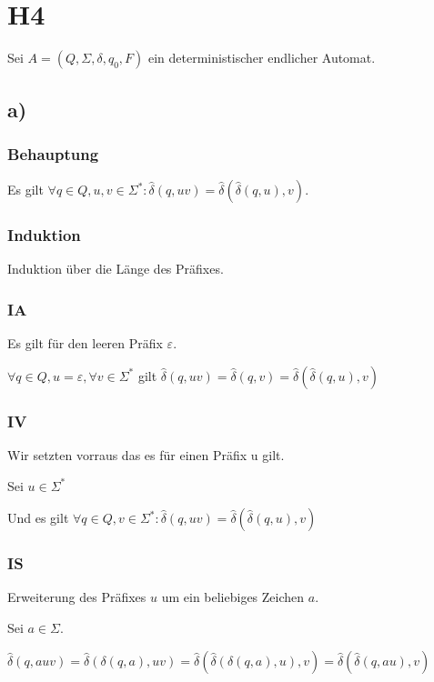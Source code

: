 \section*{H4}

Sei $A=(Q,\Sigma,\delta,q_0,F)$ ein deterministischer endlicher Automat.

\subsection*{a)}

	\subsubsection*{Behauptung}
	
	Es gilt $\forall q \in Q, u, v \in \Sigma^*: \hat{\delta}(q,uv) = \hat{\delta}(\hat{\delta}(q,u),v)$.

	\subsubsection*{Induktion}
	Induktion über die Länge des Präfixes.

	\subsubsection*{IA}
		Es gilt für den leeren Präfix $\varepsilon$.
		
		$\forall q \in Q, u = \varepsilon, \forall v \in \Sigma^*$ gilt $\hat{\delta}(q,uv) =  \hat{\delta}(q,v) = \hat{\delta}(\hat{\delta}(q,u),v)$ 

	\subsubsection*{IV}
	Wir setzten vorraus das es für einen Präfix u gilt.
	
	Sei $u \in \Sigma^*$
	
	Und es gilt 	
	$\forall q \in Q, v \in \Sigma^*:\hat{\delta}(q,uv) =  \hat{\delta}(\hat{\delta}(q,u),v)$ 
	
	\subsubsection*{IS}
	Erweiterung des Präfixes $u$ um ein beliebiges Zeichen $a$.
	
	Sei $a \in \Sigma$.
	
	$\hat{\delta}(q,auv)
	= \hat{\delta}(\delta(q,a),uv)
	= \hat{\delta}(\hat{\delta}(\delta(q,a),u),v)
	= \hat{\delta}(\hat{\delta}(q,au),v)$
